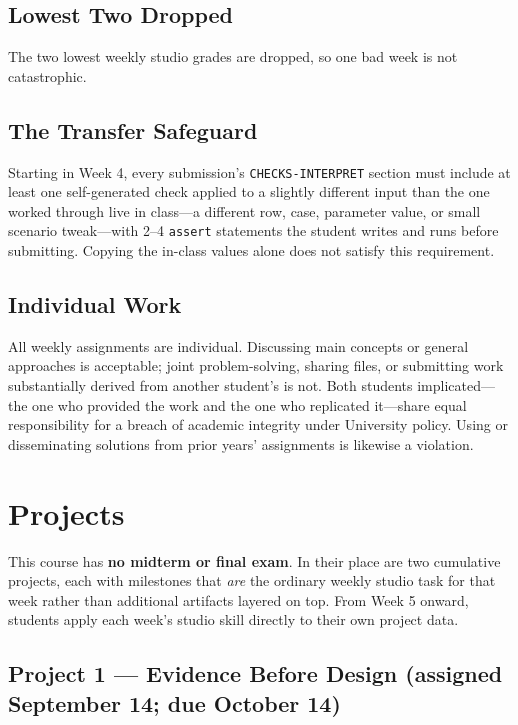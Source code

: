 \documentclass[11pt]{article}
\begin{document}
\subsection{Lowest Two Dropped}

The two lowest weekly studio grades are dropped, so one bad week is not catastrophic.

\subsection{The Transfer Safeguard}

Starting in Week 4, every submission's \texttt{CHECKS-INTERPRET} section must include at least
one self-generated check applied to a slightly different input than the one worked through
live in class---a different row, case, parameter value, or small scenario tweak---with 2--4
\texttt{assert} statements the student writes and runs before submitting. Copying the in-class
values alone does not satisfy this requirement.

\subsection{Individual Work}

All weekly assignments are individual. Discussing main concepts or general approaches is
acceptable; joint problem-solving, sharing files, or submitting work substantially derived
from another student's is not. Both students implicated---the one who provided the work and
the one who replicated it---share equal responsibility for a breach of academic integrity
under University policy. Using or disseminating solutions from prior years' assignments is
likewise a violation.

\section{Projects}

This course has \textbf{no midterm or final exam}. In their place are two cumulative projects,
each with milestones that \emph{are} the ordinary weekly studio task for that week rather than
additional artifacts layered on top. From Week 5 onward, students apply each week's studio
skill directly to their own project data.

\subsection{Project 1 --- Evidence Before Design (assigned September 14; due October 14)}
\end{document}
